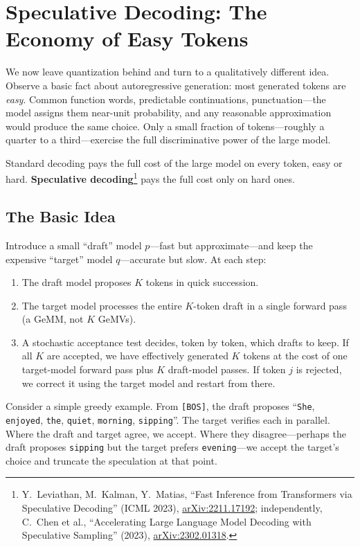 \documentclass[11pt,a4paper]{article}
\theoremstyle{definition}
\theoremstyle{remark}
\theoremstyle{plain}
\newcommand{\arxivlink}[1]{\href{https://arxiv.org/abs/#1}{arXiv:#1}}
\begin{document}
\section{Speculative Decoding: The Economy of Easy Tokens}
\label{sec:spec-dec}

We now leave quantization behind and turn to a qualitatively different
idea. Observe a basic fact about autoregressive generation: most generated
tokens are \emph{easy}. Common function words, predictable continuations,
punctuation---the model assigns them near-unit probability, and any
reasonable approximation would produce the same choice. Only a small
fraction of tokens---roughly a quarter to a third---exercise the full
discriminative power of the large model.

Standard decoding pays the full cost of the large model on every token,
easy or hard. \textbf{Speculative decoding}\footnote{Y.\ Leviathan,
M.\ Kalman, Y.\ Matias, ``Fast Inference from Transformers via Speculative
Decoding'' (ICML 2023), \arxivlink{2211.17192}; independently, C.\ Chen
et al., ``Accelerating Large Language Model Decoding with Speculative
Sampling'' (2023), \arxivlink{2302.01318}.} pays the full cost only on
hard ones.

\subsection{The Basic Idea}

Introduce a small ``draft'' model $p$---fast but approximate---and keep the
expensive ``target'' model $q$---accurate but slow. At each step:

\begin{enumerate}[leftmargin=1.8em, itemsep=2pt]
  \item The draft model proposes $K$ tokens in quick succession.
  \item The target model processes the entire $K$-token draft in a single
        forward pass (a GeMM, not $K$ GeMVs).
  \item A stochastic acceptance test decides, token by token, which drafts
        to keep. If all $K$ are accepted, we have effectively generated
        $K$ tokens at the cost of one target-model forward pass plus $K$
        draft-model passes. If token $j$ is rejected, we correct it using
        the target model and restart from there.
\end{enumerate}

Consider a simple greedy example. From \texttt{[BOS]}, the draft proposes
``\texttt{She}, \texttt{enjoyed}, \texttt{the}, \texttt{quiet},
\texttt{morning}, \texttt{sipping}''. The target verifies each in
parallel. Where the draft and target agree, we accept. Where they
disagree---perhaps the draft proposes \texttt{sipping} but the target
prefers \texttt{evening}---we accept the target's choice and truncate the
speculation at that point.
\end{document}
